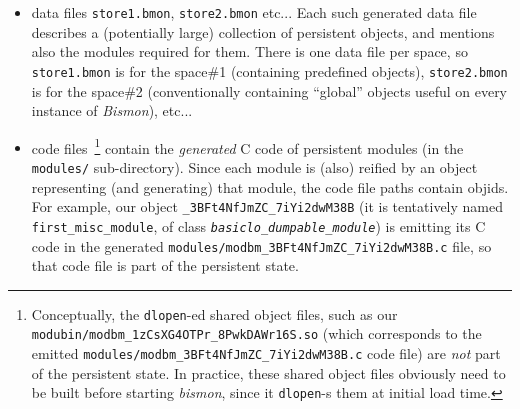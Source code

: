 \begin{itemize}
\item data files \texttt{store1.bmon}, \texttt{store2.bmon}
  etc... Each such generated data file describes a (potentially large)
  collection of persistent objects, and mentions also the modules
  required for them. There is one data file per space, so
  \texttt{store1.bmon} is for the space\#1 (containing predefined
  objects), \texttt{store2.bmon} is for the space\#2 (conventionally
  containing ``global'' objects useful on every instance of
  \emph{Bismon}), etc...

  \item code files~\footnote{Conceptually, the \texttt{dlopen}-ed
    shared object files, such as our
    \texttt{modubin/modbm\_1zCsXG4OTPr\_8PwkDAWr16S.so} (which
    corresponds to the emitted
    \texttt{modules/modbm\_3BFt4NfJmZC\_7iYi2dwM38B.c} code file) are
    \emph{not} part of the persistent state. In practice, these shared
    object files obviously need to be built before starting
    \emph{bismon}, since it \texttt{dlopen}-s them at initial load
    time.} contain the \emph{generated} C code of persistent modules
    (in the \texttt{modules/} sub-directory). Since each module is
    (also) reified by an object representing (and generating) that
    module, the code file paths contain objids. For example, our
    object \texttt{\_3BFt4NfJmZC\_7iYi2dwM38B} (it is tentatively
    named \texttt{first\_misc\_module}, of class
    \texttt{\emph{basiclo\_dumpable\_module}}) is emitting its C code
    in the generated
    {\small{\texttt{modules/modbm\_3BFt4NfJmZC\_7iYi2dwM38B.c}}} file,
    so that code file is part of the persistent state.
\end{itemize}

